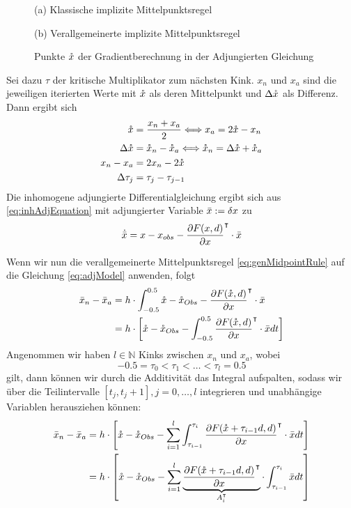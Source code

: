 \begin{figure}[H]
\footnotesize
\centering
\begin{minipage}[b]{\linewidth}

\caption*{(a) Klassische implizite Mittelpunktsregel}
\end{minipage}
\begin{minipage}[b]{\linewidth}

\caption*{(b) Verallgemeinerte implizite Mittelpunktsregel}
\end{minipage}
\caption{Punkte $\mathring{x}$ der Gradientberechnung in der Adjungierten Gleichung}
\label{fig:multipleKinksAdjoint}
\end{figure}


Sei dazu $\tau$ der kritische Multiplikator zum nächsten Kink. $x_n$ und $x_a$ sind die jeweiligen iterierten Werte mit $\mathring{x}$ als deren Mittelpunkt und $\Delta \mathring{x}$ als Differenz. Dann ergibt sich 
\begin{align*}
\mathring{x} &= \frac{x_n+x_a}{2}\Longleftrightarrow x_a = 2\mathring{x} - x_n\\
\Delta \mathring{x} &= \mathring{x}_n - \mathring{x}_a \Longleftrightarrow \mathring{x}_n = \Delta \mathring{x} + \mathring{x}_a\\
x_n - x_a &= 2x_n - 2\mathring{x}\\
\Delta \tau_j&=\tau_j-\tau_{j-1}
\end{align*}
Die inhomogene adjungierte Differentialgleichung ergibt sich aus \eqref{eq:inhAdjEquation} mit adjungierter Variable $\bar{x} := \delta x$ zu
\begin{equation}
\dot{\bar{x}} = x - x_{obs} - \frac{\partial F(x,d)}{\partial x}^\intercal \cdot \bar{x}
\label{eq:adjModel}
\end{equation}

Wenn wir nun die verallgemeinerte Mittelpunktsregel \eqref{eq:genMidpointRule} auf die Gleichung \eqref{eq:adjModel} anwenden, folgt
\begin{align*}
\bar{x}_n - \bar{x}_a &= h\cdot \int_{-0.5}^{0.5}\mathring{x}-\mathring{x}_{Obs} - \frac{\partial F(\mathring{x},d)}{\partial x}^\intercal \cdot \bar{x}\\
									&= h\cdot \left[\mathring{x}-\mathring{x}_{Obs} - \int_{-0.5}^{0.5} \frac{\partial F(\mathring{x} ,d)}{\partial x}^\intercal \cdot \bar{x} dt\right]\\
\end{align*}
Angenommen wir haben $l \in \mathbb{N}$ Kinks zwischen $x_n$ und $x_{a}$, wobei \[-0.5 = \tau_0 <\tau_1 <\ldots < \tau_l=0.5\] gilt, dann können wir durch die Additivität das Integral aufspalten, sodass wir über die Teilintervalle $[t_j,t_j+1], j=0,\ldots,l$ integrieren und unabhängige Variablen herausziehen können:
\begin{align*}
\bar{x}_n - \bar{x}_a &= h\cdot \left[ \mathring{x}-\mathring{x}_{Obs} - \sum_{i=1}^l \int_{\tau_{i-1}}^{\tau_{i}}\frac{\partial F(\mathring{x}+\tau_{i-1}d,d)}{\partial x}^\intercal \cdot \bar{x} dt\right]\\
									&= h\cdot \left[\mathring{x} -\mathring{x}_{Obs} - \sum_{i=1}^l \underbrace{\frac{\partial F(\mathring{x}+\tau_{i-1}d,d)}{\partial x}^\intercal }_{A_i^\intercal} \cdot \int_{\tau_{i-1}}^{\tau_{i}} \bar{x} dt\right]\\
\end{align*}

